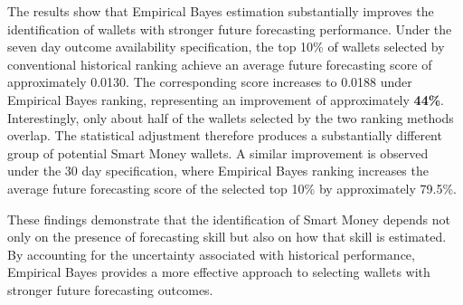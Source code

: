 The results show that Empirical Bayes estimation substantially improves the identification of wallets with stronger future forecasting performance. Under the seven day outcome availability specification, the top 10\% of wallets selected by conventional historical ranking achieve an average future forecasting score of approximately 0.0130. The corresponding score increases to 0.0188 under Empirical Bayes ranking, representing an improvement of approximately \textbf{44\%}. Interestingly, only about half of the wallets selected by the two ranking methods overlap. The statistical adjustment therefore produces a substantially different group of potential Smart Money wallets. A similar improvement is observed under the 30 day specification, where Empirical Bayes ranking increases the average future forecasting score of the selected top 10\% by approximately 79.5\%.


These findings demonstrate that the identification of Smart Money depends not only on the presence of forecasting skill but also on how that skill is estimated. By accounting for the uncertainty associated with historical performance, Empirical Bayes provides a more effective approach to selecting wallets with stronger future forecasting outcomes.
